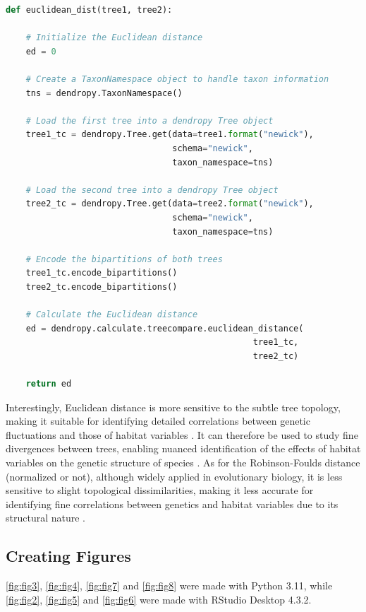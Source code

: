 \begin{lstlisting}[label=lst:euclideanDist,language=Python,caption=Python script for calculating the Euclidean distance using the ete3 and the dendropy packages in the aPhyloGeo package. The Newick format represents the phylogenetic and variable trees in text form.]
def euclidean_dist(tree1, tree2):

    # Initialize the Euclidean distance
    ed = 0

    # Create a TaxonNamespace object to handle taxon information
    tns = dendropy.TaxonNamespace()

    # Load the first tree into a dendropy Tree object
    tree1_tc = dendropy.Tree.get(data=tree1.format("newick"),
                                 schema="newick",
                                 taxon_namespace=tns)

    # Load the second tree into a dendropy Tree object
    tree2_tc = dendropy.Tree.get(data=tree2.format("newick"),
                                 schema="newick",
                                 taxon_namespace=tns)

    # Encode the bipartitions of both trees
    tree1_tc.encode_bipartitions()
    tree2_tc.encode_bipartitions()

    # Calculate the Euclidean distance
    ed = dendropy.calculate.treecompare.euclidean_distance(
                                                 tree1_tc,
                                                 tree2_tc)

    return ed
\end{lstlisting}

Interestingly, Euclidean distance is more sensitive to the subtle tree topology, making it suitable for identifying detailed correlations between genetic fluctuations and those of habitat variables \citep{czarna2006topology}. It can therefore be used to study fine divergences between trees, enabling nuanced identification of the effects of habitat variables on the genetic structure of species \citep{czarna2006topology}. As for the Robinson-Foulds distance (normalized or not), although widely applied in evolutionary biology, it is less sensitive to slight topological dissimilarities, making it less accurate for identifying fine correlations between genetics and habitat variables due to its structural nature \citep{smith2019bayesian, smith2020information}.

\subsection{Creating Figures}\label{Figures}
\autoref{fig:fig3}, \autoref{fig:fig4}, \autoref{fig:fig7} and \autoref{fig:fig8} were made with Python 3.11, while \autoref{fig:fig2}, \autoref{fig:fig5} and \autoref{fig:fig6} were made with RStudio Desktop 4.3.2.

